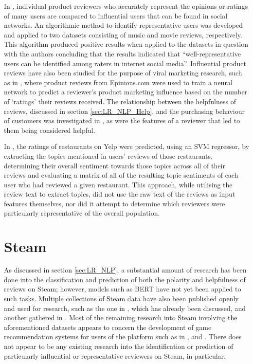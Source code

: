 In \cite{choi2013representative}, individual product reviewers who accurately represent the opinions or ratings of many users are compared to influential users that can be found in social networks. An algorithmic method to identify representative users was developed and applied to two datasets consisting of music and movie reviews, respectively. This algorithm produced positive results when applied to the datasets in question with the authors concluding that the results indicated that ``well-representative users can be identified among raters in internet social media''. Influential product reviews have also been studied for the purpose of viral marketing research, such as in \cite{li2009discovering}, where product reviews from Epinions.com were used to train a neural network to predict a reviewer's product marketing influence based on the number of `ratings' their reviews received. The relationship between the helpfulness of reviews, discussed in section \ref{sec:LR_NLP_Help}, and the purchasing behaviour of customers was investigated in \cite{malik2020exploring}, as were the features of a reviewer that led to them being considered helpful.

In \cite{kamath2016understanding}, the ratings of restaurants on Yelp were predicted, using an SVM regressor, by extracting the topics mentioned in users' reviews of those restaurants, determining their overall sentiment towards those topics across all of their reviews and evaluating a matrix of all of the resulting topic sentiments of each user who had reviewed a given restaurant. This approach, while utilising the review text to extract topics, did not use the raw text of the reviews as input features themselves, nor did it attempt to determine which reviewers were particularly representative of the overall population.

\section{Steam} \label{sec:LR_Steam}

As discussed in section \ref{sec:LR_NLP}, a substantial amount of research has been done into the classification and prediction of both the polarity and helpfulness of reviews on Steam; however, models such as BERT have not yet been applied to such tasks. Multiple collections of Steam data have also been published openly and used for research, such as the one in \cite{zuo2018sentiment}, which has already been discussed, and another gathered in \cite{o2016condensing}. Most of the remaining research into Steam involving the aforementioned datasets appears to concern the development of game recommendation systems for users of the platform such as in \cite{saaidin2020recommender}, \cite{wang2020using} and \cite{linsteam}. There does not appear to be any existing research into the identification or prediction of particularly influential or representative reviewers on Steam, in particular.
